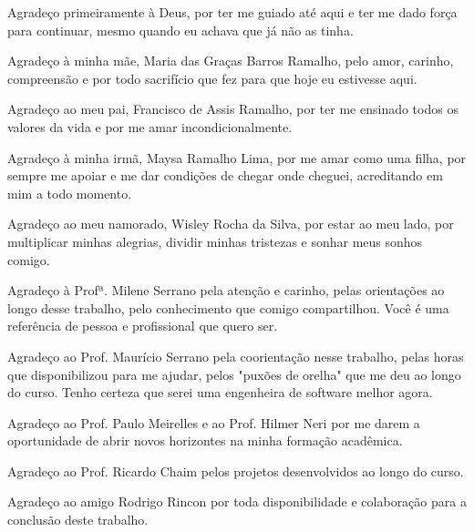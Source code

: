 \begin{agradecimentos}
Agradeço primeiramente à Deus, por ter me guiado até aqui e ter me dado força para continuar, mesmo quando eu achava que já não as tinha.

Agradeço à minha mãe, Maria das Graças Barros Ramalho, pelo amor, carinho, compreensão e por todo sacrifício que fez para que hoje eu estivesse aqui.

Agradeço ao meu pai, Francisco de Assis Ramalho, por ter me ensinado todos os valores da vida e por me amar incondicionalmente.

Agradeço à minha irmã, Maysa Ramalho Lima, por me amar como uma filha, por sempre me apoiar e me dar condições de chegar onde cheguei, acreditando em mim a todo momento.   

Agradeço ao meu namorado, Wisley Rocha da Silva, por estar ao meu lado, por multiplicar minhas alegrias, dividir minhas tristezas e sonhar meus sonhos comigo. 

Agradeço à Profª. Milene Serrano pela atenção e carinho, pelas orientações ao longo desse trabalho, pelo conhecimento que comigo compartilhou. Você é uma referência de pessoa e profissional que quero ser.

Agradeço ao Prof. Maurício Serrano pela coorientação nesse trabalho, pelas horas que disponibilizou para me ajudar, pelos "puxões de orelha" que me deu ao longo do curso. Tenho certeza que serei uma engenheira de software melhor agora.

Agradeço ao Prof. Paulo Meirelles e ao Prof. Hilmer Neri por me darem a oportunidade de abrir novos horizontes na minha formação acadêmica.

Agradeço ao Prof. Ricardo Chaim pelos projetos desenvolvidos ao longo do curso. 

Agradeço ao amigo Rodrigo Rincon por toda disponibilidade e colaboração para a conclusão deste trabalho.
\end{agradecimentos}
